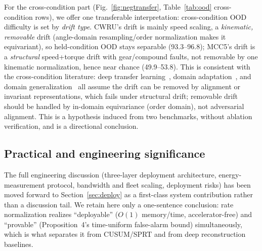 \documentclass[journal]{IEEEtran}
\begin{document}
For the cross-condition part (Fig.~\ref{fig:negtransfer}, Table~\ref{tab:ood} cross-condition rows), we offer one transferable interpretation: cross-condition OOD difficulty is set by \emph{drift type}. CWRU's drift is mainly speed scaling, a \emph{kinematic, removable} drift (angle-domain resampling/order normalization makes it equivariant), so held-condition OOD stays separable (93.3--96.8); MCC5's drift is a \emph{structural} speed+torque drift with gear/compound faults, not removable by one kinematic normalization, hence near chance (49.9--53.8). This is consistent with the cross-condition literature: deep transfer learning~\cite{chen2023transfer}, domain adaptation~\cite{zhang2023domain}, and domain generalization~\cite{zhou2023dg,xiao2024dg} all assume the drift can be removed by alignment or invariant representations, which fails under structural drift; removable drift should be handled by in-domain equivariance (order domain), not adversarial alignment. This is a hypothesis induced from two benchmarks, without ablation verification, and is a directional conclusion.

\subsection{Practical and engineering significance}
The full engineering discussion (three-layer deployment architecture, energy-measurement protocol, bandwidth and fleet scaling, deployment risks) has been moved forward to Section~\ref{sec:deploy} as a first-class system contribution rather than a discussion tail. We retain here only a one-sentence conclusion: rate normalization realizes ``deployable'' ($O(1)$ memory/time, accelerator-free) and ``provable'' (Proposition~4's time-uniform false-alarm bound) simultaneously, which is what separates it from CUSUM/SPRT and from deep reconstruction baselines.
\end{document}
